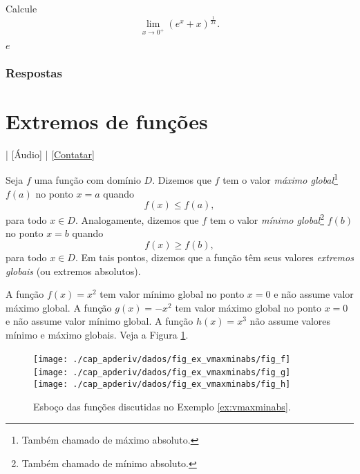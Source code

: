 \begin{exer}
  Calcule
  \begin{equation}
    \lim_{x\to 0^+} \left(e^x + x\right)^{\frac{1}{2x}}.
  \end{equation}
\end{exer}
\begin{resp}
  $e$
\end{resp}

\ifisbook
\subsubsection{Respostas}
\shipoutAnswer
\fi


\section{Extremos de funções}\label{cap_apderiv_sec_extfun}

\begin{flushright}
  [Vídeo] | [Áudio] | \href{https://phkonzen.github.io/notas/contato.html}{[Contatar]}
\end{flushright}

Seja $f$ uma função com domínio $D$. Dizemos que $f$ tem o valor \emph{máximo global}\footnote{Também chamado de máximo absoluto.} $f(a)$ no ponto $x=a$ quando
\begin{equation}
  f(x) \leq f(a),
\end{equation}
para todo $x\in D$. Analogamente, dizemos que $f$ tem o valor \emph{mínimo global}\footnote{Também chamado de mínimo absoluto.} $f(b)$ no ponto $x=b$ quando
\begin{equation}
  f(x) \geq f(b),
\end{equation}
para todo $x\in D$. Em tais pontos, dizemos que a função têm seus valores \emph{extremos globais} (ou extremos absolutos).

\begin{ex}\label{ex:vmaxminabs}
  A função $f(x) = x^2$ tem valor mínimo global no ponto $x=0$ e não assume valor máximo global. A função $g(x) = -x^2$ tem valor máximo global no ponto $x=0$ e não assume valor mínimo global. A função $h(x)=x^3$ não assume valores mínimo e máximo globais. Veja a Figura \ref{fig:ex_vmaxminabs}.

  \begin{figure}[H]
    \centering
    \texttt{[image: ./cap\_apderiv/dados/fig\_ex\_vmaxminabs/fig\_f]}~
    \texttt{[image: ./cap\_apderiv/dados/fig\_ex\_vmaxminabs/fig\_g]}~
    \texttt{[image: ./cap\_apderiv/dados/fig\_ex\_vmaxminabs/fig\_h]}
    \caption{Esboço das funções discutidas no Exemplo \ref{ex:vmaxminabs}.}
    \label{fig:ex_vmaxminabs}
  \end{figure}
\end{ex}

